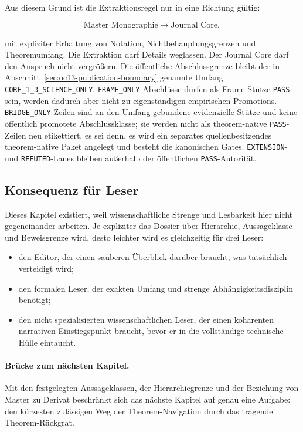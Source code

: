 Aus diesem Grund ist die Extraktionsregel nur in eine Richtung gültig:

\[
\text{Master Monographie} \longrightarrow \text{Journal Core},
\]

mit expliziter Erhaltung von Notation, Nichtbehauptungsgrenzen und Theoremumfang.
Die Extraktion darf Details weglassen. Der Journal Core darf den Anspruch nicht
vergrößern.
Die öffentliche Abschlussgrenze bleibt der in
Abschnitt~\ref{sec:oc13-publication-boundary} genannte Umfang
\texttt{CORE\_1\_3\_SCIENCE\_ONLY}. \texttt{FRAME\_ONLY}-Abschlüsse dürfen als
Frame-Stütze \texttt{PASS} sein, werden dadurch aber nicht zu eigenständigen
empirischen Promotions. \texttt{BRIDGE\_ONLY}-Zeilen sind an den Umfang
gebundene evidenzielle Stütze und keine öffentlich promotete Abschlussklasse;
sie werden nicht als theorem-native \texttt{PASS}-Zeilen neu etikettiert, es
sei denn, es wird ein separates quellenbesitzendes theorem-native Paket
angelegt und besteht die kanonischen Gates. \texttt{EXTENSION}- und
\texttt{REFUTED}-Lanes bleiben außerhalb der öffentlichen \texttt{PASS}-Autorität.

\subsection{Konsequenz für Leser}

Dieses Kapitel existiert, weil wissenschaftliche Strenge und Lesbarkeit hier
nicht gegeneinander arbeiten.
Je expliziter das Dossier über Hierarchie, Aussageklasse und Beweisgrenze wird,
desto leichter wird es gleichzeitig für drei Leser:

\begin{itemize}
\item den Editor, der einen sauberen Überblick darüber braucht, was tatsächlich
      verteidigt wird;
\item den formalen Leser, der exakten Umfang und strenge Abhängigkeitsdisziplin
      benötigt;
\item den nicht spezialisierten wissenschaftlichen Leser, der einen kohärenten
      narrativen Einstiegspunkt braucht, bevor er in die vollständige technische
      Hülle eintaucht.
\end{itemize}

\paragraph{Brücke zum nächsten Kapitel.}
Mit den festgelegten Aussageklassen, der Hierarchiegrenze und der Beziehung von
Master zu Derivat beschränkt sich das nächste Kapitel auf genau eine Aufgabe:
den kürzesten zulässigen Weg der Theorem-Navigation durch das tragende
Theorem-Rückgrat.

